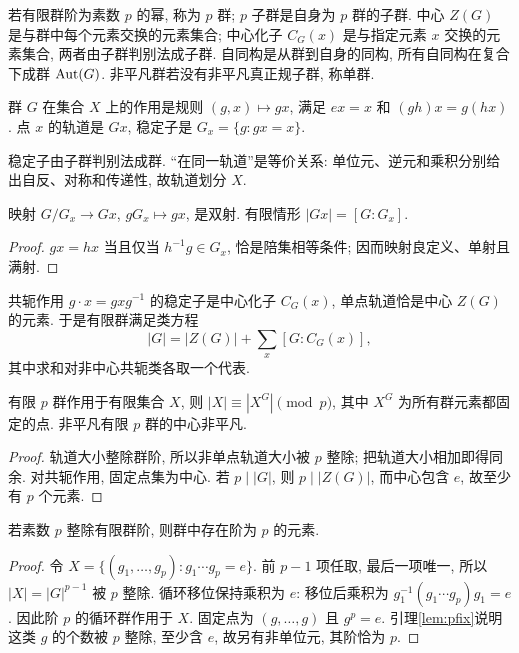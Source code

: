 \begin{definition}
若有限群阶为素数 $p$ 的幂, 称为 $p$ 群; $p$ 子群是自身为 $p$ 群的子群. 中心 $Z(G)$ 是与群中每个元素交换的元素集合; 中心化子 $C_G(x)$ 是与指定元素 $x$ 交换的元素集合, 两者由子群判别法成子群. 自同构是从群到自身的同构, 所有自同构在复合下成群 $\operatorname{Aut}(G)$. 非平凡群若没有非平凡真正规子群, 称单群.
\end{definition}
\begin{definition}
群 $G$ 在集合 $X$ 上的作用是规则 $(g,x)\mapsto gx$, 满足 $ex=x$ 和 $(gh)x=g(hx)$. 点 $x$ 的轨道是 $Gx$, 稳定子是 $G_x=\{g:gx=x\}$.
\end{definition}
稳定子由子群判别法成群. “在同一轨道”是等价关系: 单位元、逆元和乘积分别给出自反、对称和传递性, 故轨道划分 $X$.
\begin{theorem}[轨道稳定子公式]\label{thm:orbit}
映射 $G/G_x\to Gx$, $gG_x\mapsto gx$, 是双射. 有限情形 $|Gx|=[G:G_x]$.
\end{theorem}
\begin{proof}
$gx=hx$ 当且仅当 $h^{-1}g\in G_x$, 恰是陪集相等条件; 因而映射良定义、单射且满射.
\end{proof}
共轭作用 $g\cdot x=gxg^{-1}$ 的稳定子是中心化子 $C_G(x)$, 单点轨道恰是中心 $Z(G)$ 的元素. 于是有限群满足类方程
\[
|G|=|Z(G)|+\sum_x[G:C_G(x)],
\]
其中求和对非中心共轭类各取一个代表.
\begin{lemma}\label{lem:pfix}
有限 $p$ 群作用于有限集合 $X$, 则 $|X|\equiv|X^G|\pmod p$, 其中 $X^G$ 为所有群元素都固定的点. 非平凡有限 $p$ 群的中心非平凡.
\end{lemma}
\begin{proof}
轨道大小整除群阶, 所以非单点轨道大小被 $p$ 整除; 把轨道大小相加即得同余. 对共轭作用, 固定点集为中心. 若 $p\mid|G|$, 则 $p\mid|Z(G)|$, 而中心包含 $e$, 故至少有 $p$ 个元素.
\end{proof}
\begin{theorem}[柯西]\label{thm:cauchy}
若素数 $p$ 整除有限群阶, 则群中存在阶为 $p$ 的元素.
\end{theorem}
\begin{proof}
令 $X=\{(g_1,\ldots,g_p):g_1\cdots g_p=e\}$. 前 $p-1$ 项任取, 最后一项唯一, 所以 $|X|=|G|^{p-1}$ 被 $p$ 整除. 循环移位保持乘积为 $e$: 移位后乘积为 $g_1^{-1}(g_1\cdots g_p)g_1=e$. 因此阶 $p$ 的循环群作用于 $X$. 固定点为 $(g,\ldots,g)$ 且 $g^p=e$. 引理\ref{lem:pfix}说明这类 $g$ 的个数被 $p$ 整除, 至少含 $e$, 故另有非单位元, 其阶恰为 $p$.
\end{proof}
